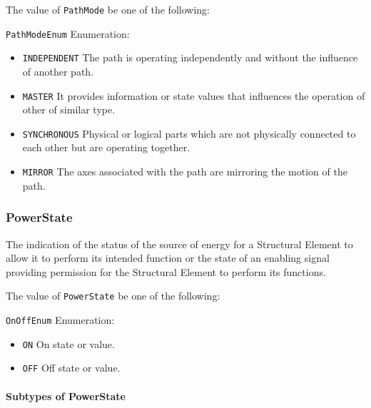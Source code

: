 The value of \texttt{PathMode} \MUST be one of the following: 


\texttt{PathModeEnum} Enumeration:

\begin{itemize}
\item \texttt{INDEPENDENT} \newline The path is operating independently and without the influence of another path. 
\item \texttt{MASTER} \newline It provides information or state values that influences the operation of other  of similar type. 
\item \texttt{SYNCHRONOUS} \newline Physical or logical parts which are not physically connected to each other but are operating together. 
\item \texttt{MIRROR} \newline The axes associated with the path are mirroring the motion of the  path. 
\end{itemize}

\FloatBarrier

\subsubsection{PowerState}
\label{sec:PowerState}



The indication of the status of the source of energy for a \gls{Structural Element} to allow it to perform its intended function or the state of an enabling signal providing permission for the \gls{Structural Element} to perform its functions.


The value of \texttt{PowerState} \MUST be one of the following: 


\texttt{OnOffEnum} Enumeration:

\begin{itemize}
\item \texttt{ON} \newline On state or value. 
\item \texttt{OFF} \newline Off state or value. 
\end{itemize}

\FloatBarrier

\paragraph{Subtypes of PowerState}\mbox{}
\label{sec:Subtypes of PowerState}

